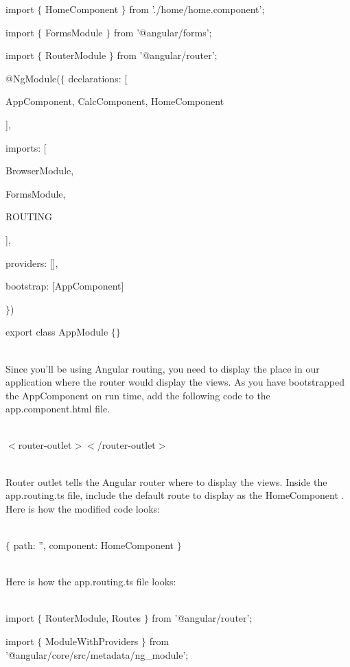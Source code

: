 \documentclass{article}
\begin{document}
\noindent import $\mathrm{\{}$ HomeComponent $\mathrm{\}}$ from './home/home.component'; 

\noindent import $\mathrm{\{}$ FormsModule $\mathrm{\}}$ from '@angular/forms';

\noindent import $\mathrm{\{}$ RouterModule $\mathrm{\}}$ from '@angular/router';

\noindent 

\noindent @NgModule($\mathrm{\{}$ declarations: [

\noindent AppComponent, CalcComponent, HomeComponent

\noindent ],

\noindent imports: [ 

\noindent BrowserModule,

\noindent FormsModule, 

\noindent ROUTING

\noindent ],

\noindent providers: [],

\noindent bootstrap: [AppComponent]

\noindent $\mathrm{\}}$)

\noindent export class AppModule $\mathrm{\{}$$\mathrm{\}}$

\noindent 
\newpage
\noindent \\ Since you'll be using Angular routing, you need to display the place in our application where the router would display the views. As you have bootstrapped the AppComponent on run time, add the following code to the app.component.html file.

\noindent \\ $\mathrm{<}$router-outlet$\mathrm{>}$$\mathrm{<}$/router-outlet$\mathrm{>}$

\noindent \\ Router outlet tells the Angular router where to display the views. Inside the app.routing.ts file, include the default route to display as the HomeComponent . Here is how the modified code looks:

\noindent \\ $\mathrm{\{}$ path: '', component: HomeComponent $\mathrm{\}}$

\noindent \\ Here is how the app.routing.ts file looks:

\noindent \\ import $\mathrm{\{}$ RouterModule, Routes $\mathrm{\}}$ from '@angular/router'; 

\noindent import $\mathrm{\{}$ ModuleWithProviders $\mathrm{\}}$ from '@angular/core/src/metadata/ng\_module';
\end{document}
